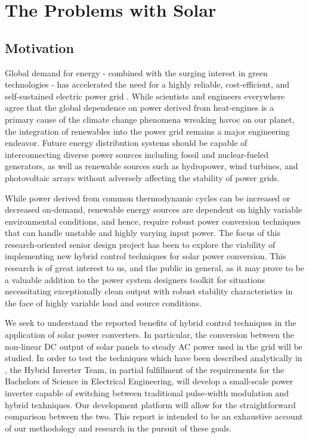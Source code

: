 
\chapter{The Problems with Solar} %

\label{Chapter1} %



\section{Motivation}
Global demand for energy - combined with the surging interest in green technologies - has accelerated the need for a highly reliable, cost-efficient, and self-sustained electric power grid \cite{futureGrid}. While scientists and engineers everywhere agree that the global dependence on power derived from heat-engines is a primary cause of the climate change phenomena wreaking havoc on our planet, the integration of renewables into the power grid remains a major engineering endeavor. Future energy distribution systems should be capable of interconnecting diverse power sources including fossil and nuclear-fueled generators, as well as renewable sources such as hydropower, wind turbines, and photovoltaic arrays without adversely affecting the stability of power grids. 

While power derived from common thermodynamic cycles can be increased or decreased on-demand, renewable energy sources are dependent on highly variable environmental conditions, and hence, require robust power conversion techniques that can handle unstable and highly varying input power\cite{ricardo}. The focus of this research-oriented senior design project has been to explore the viability of implementing new hybrid control techniques for solar power conversion. This research is of great interest to us, and the public in general, as it may prove to be a valuable addition to the power system designers toolkit for situations necessitating exceptionally clean output with robust stability characteristics in the face of highly variable load and source conditions.

We seek to understand the reported benefits of hybrid control techniques in the application of solar power converters. In particular, the conversion between the non-linear DC output of solar panels to steady AC power used in the grid will be studied. In order to test the techniques which have been described analytically in \cite{ricardo}, the Hybrid Inverter Team, in partial fulfillment of the requirements for the Bachelors of Science in Electrical Engineering, will develop a small-scale power inverter capable of switching between traditional pulse-width modulation and hybrid texhniques. Our development platform will allow for the straightforward comparison between the two. This report is intended to be an exhaustive account of our methodology and research in the pursuit of these goals.

